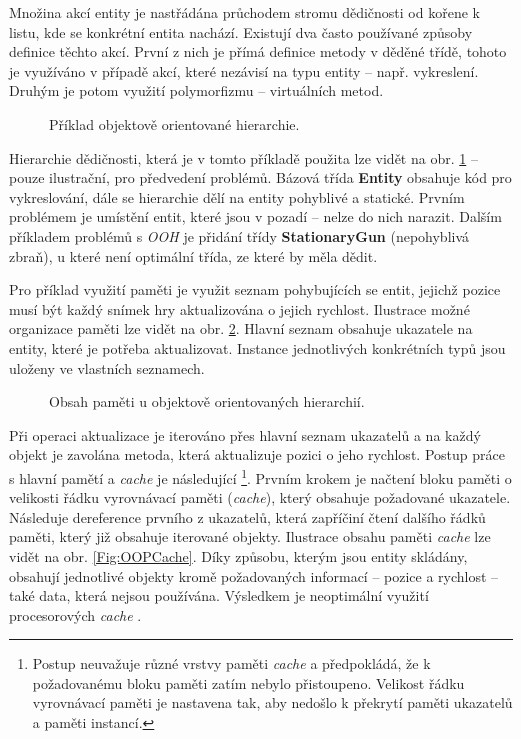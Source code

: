 Množina akcí entity je nastřádána průchodem stromu dědičnosti od kořene k listu, kde se konkrétní entita nachází. Existují dva často používané způsoby definice těchto akcí. První z nich je přímá definice metody v děděné třídě, tohoto je využíváno v případě akcí, které nezávisí na typu entity -- např. vykreslení. Druhým je potom využití polymorfizmu -- virtuálních metod.

\begin{figure}[H]
	\caption{Příklad objektově orientované hierarchie.}
	\label{Fig:OOPHierarchy}
\end{figure}

Hierarchie dědičnosti, která je v tomto příkladě použita lze vidět na obr. \ref{Fig:OOPHierarchy} -- pouze ilustrační, pro předvedení problémů. Bázová třída \textbf{Entity} obsahuje kód pro vykreslování, dále se hierarchie dělí na entity pohyblivé a statické. Prvním problémem je umístění entit, které jsou v pozadí -- nelze do nich narazit. Dalším příkladem problémů s \emph{OOH} je přidání třídy \textbf{StationaryGun} (nepohyblivá zbraň), u které není optimální třída, ze které by měla dědit.

Pro příklad využití paměti je využit seznam pohybujících se entit, jejichž pozice musí být každý snímek hry aktualizována o jejich rychlost. Ilustrace možné organizace paměti lze vidět na obr. \ref{Fig:OOPMemory}. Hlavní seznam obsahuje ukazatele na entity, které je potřeba aktualizovat. Instance jednotlivých konkrétních typů jsou uloženy ve vlastních seznamech.

\begin{figure}
	\caption{Obsah paměti u objektově orientovaných hierarchií.}
	\label{Fig:OOPMemory}
\end{figure}

Při operaci aktualizace je iterováno přes hlavní seznam ukazatelů a na každý objekt je zavolána metoda, která aktualizuje pozici o jeho rychlost. Postup práce s hlavní pamětí a \emph{cache} je následující \footnote{Postup neuvažuje různé vrstvy paměti \emph{cache} a předpokládá, že k požadovanému bloku paměti zatím nebylo přistoupeno. Velikost řádku vyrovnávací paměti je nastavena tak, aby nedošlo k překrytí paměti ukazatelů a paměti instancí.}. Prvním krokem je načtení bloku paměti o velikosti řádku vyrovnávací paměti (\emph{cache}), který obsahuje požadované ukazatele. Následuje dereference prvního z ukazatelů, která zapříčiní čtení dalšího řádků paměti, který již obsahuje iterované objekty. Ilustrace obsahu paměti \emph{cache} lze vidět na obr. \ref{Fig:OOPCache}. Díky způsobu, kterým jsou entity skládány, obsahují jednotlivé objekty kromě požadovaných informací -- pozice a rychlost -- také data, která nejsou používána. Výsledkem je neoptimální využití procesorových \emph{cache} \cite{DataOrientedDesignDice}.

